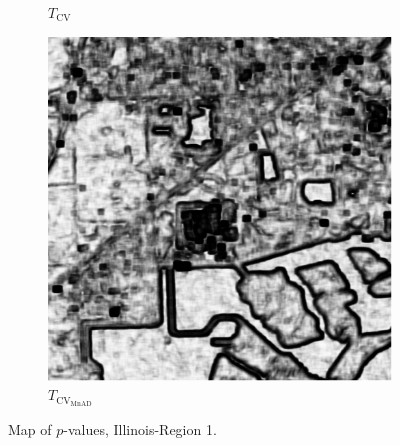 \documentclass[aspectratio=1610,10pt]{beamer}
\begin{document}
\begin{frame}
\begin{figure}[H]
\begin{subfigure}[b]{0.3\textwidth}
    \caption{$T_\text{CV}$}
    \label{fig:lake_pvalue-2}
  \end{subfigure}
  \hfill
  \begin{subfigure}[b]{0.3\textwidth}
    \centering
    \includegraphics[width=\textwidth]{../../Figures/PNG/mnad_p_values_lake_512}
     \caption{$T_{\text{CV}_{\text{MnAD}}}$}
    \label{fig:lake_pvalue-3}
  \end{subfigure}
  \caption{Map of $p$-values, Illinois-Region 1. }
  \label{fig:lake_pvalue}
\end{figure}
\end{frame} 
\end{document}
